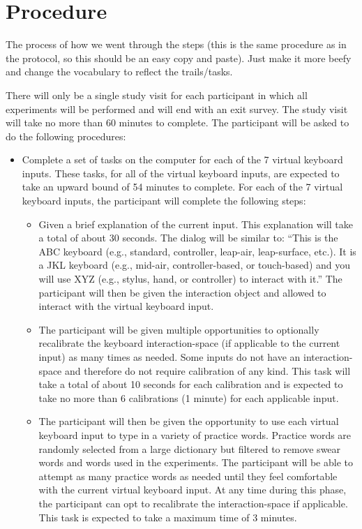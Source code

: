 \section{Procedure}

The process of how we went through the steps (this is the same procedure as in the protocol, so this should be an easy copy and paste). Just make it more beefy and change the vocabulary to reflect the trails/tasks.

There will only be a single study visit for each participant in which all experiments will be performed and will end with an exit survey. The study visit will take no more than 60 minutes to complete. The participant will be asked to do the following procedures:

\begin{itemize}
\item Complete a set of tasks on the computer for each of the 7 virtual keyboard inputs. These tasks, for all of the virtual keyboard inputs, are expected to take an upward bound of 54 minutes to complete. For each of the 7 virtual keyboard inputs, the participant will complete the following steps:
\begin{itemize}
\item Given a brief explanation of the current input. This explanation will take a total of about 30 seconds. The dialog will be similar to: “This is the ABC keyboard (e.g., standard, controller, leap-air, leap-surface, etc.). It is a JKL keyboard (e.g., mid-air, controller-based, or touch-based) and you will use XYZ (e.g., stylus, hand, or controller) to interact with it.” The participant will then be given the interaction object and allowed to interact with the virtual keyboard input.
\item The participant will be given multiple opportunities to optionally recalibrate the keyboard interaction-space (if applicable to the current input) as many times as needed. Some inputs do not have an interaction-space and therefore do not require calibration of any kind. This task will take a total of about 10 seconds for each calibration and is expected to take no more than 6 calibrations (1 minute) for each applicable input.
\item The participant will then be given the opportunity to use each virtual keyboard input to type in a variety of practice words. Practice words are randomly selected from a large dictionary but filtered to remove swear words and words used in the experiments. The participant will be able to attempt as many practice words as needed until they feel comfortable with the current virtual keyboard input. At any time during this phase, the participant can opt to recalibrate the interaction-space if applicable. This task is expected to take a maximum time of 3 minutes.

\end{itemize}
\end{itemize}
